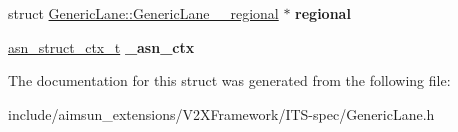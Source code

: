 \begin{DoxyCompactItemize}
\item 
struct \hyperlink{structGenericLane_1_1GenericLane____regional}{Generic\+Lane\+::\+Generic\+Lane\+\_\+\+\_\+regional} $\ast$ {\bfseries regional}\hypertarget{structGenericLane_aa11b7da18fc011f3798401961a51034e}{}\label{structGenericLane_aa11b7da18fc011f3798401961a51034e}

\item 
\hyperlink{structasn__struct__ctx__s}{asn\+\_\+struct\+\_\+ctx\+\_\+t} {\bfseries \+\_\+asn\+\_\+ctx}\hypertarget{structGenericLane_ade5a7abb5be6be5efb490f99f83392b8}{}\label{structGenericLane_ade5a7abb5be6be5efb490f99f83392b8}

\end{DoxyCompactItemize}


The documentation for this struct was generated from the following file\+:\begin{DoxyCompactItemize}
\item 
include/aimsun\+\_\+extensions/\+V2\+X\+Framework/\+I\+T\+S-\/spec/Generic\+Lane.\+h\end{DoxyCompactItemize}
